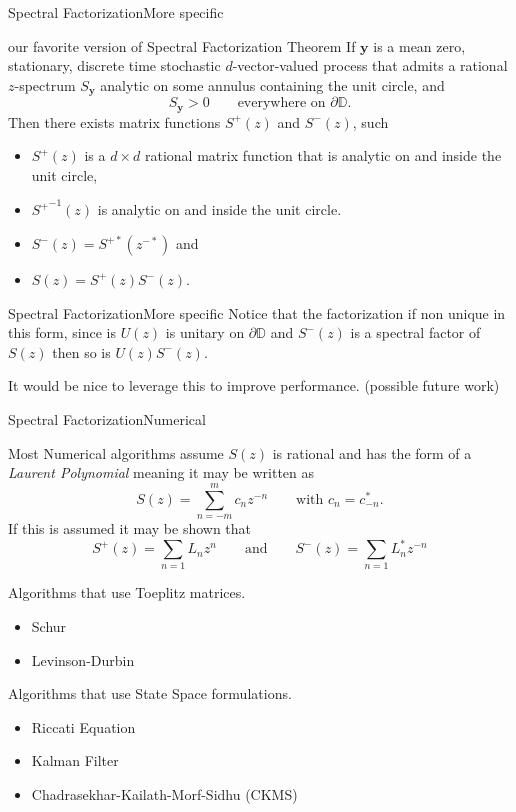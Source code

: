 \documentclass{beamer}  %
\renewcommand{\and}{\qquad \text{and}\qquad}
\newcommand{\D}{\mathbb{D}}
\begin{document}
\begin{frame}{Spectral Factorization}{More specific}
	
	\begin{block}{our favorite version of Spectral Factorization Theorem}
		If $\textbf{y}$ is a mean zero, stationary, discrete time stochastic $d$-vector-valued process that admits a rational $z$-spectrum $S_{\textbf{y}}$ analytic on some annulus containing the unit circle,  and $$S_{\textbf{y}} > 0 \qquad \text{everywhere on } \partial\D.$$ Then there exists matrix functions $S^+(z)$ and $S^-(z)$, such 
		\begin{itemize}
			\item $S^+(z)$ is a $d\times d$ rational matrix function that is analytic on and inside the unit circle,
			\item ${S^+}^{-1}(z)$ is analytic on and inside the unit circle.
			\item $S^-(z) = S^{+*}(z^{-*})$ and 
			\item $S(z) =S^+(z)S^-(z)$.	
		\end{itemize}
	\end{block}
	
\end{frame}
\begin{frame}{Spectral Factorization}{More specific}
Notice that the factorization if non unique in this form, since is $U(z)$ is unitary on $\partial \D$ and $S^-(z)$ is a spectral factor of $S(z)$ then so is $U(z)S^-(z)$.

\bigskip

It would be nice to leverage this to improve performance. (possible future work)

\end{frame}
\begin{frame}{Spectral Factorization}{Numerical}
	
	Most Numerical algorithms assume $S(z)$ is rational and has the form of a \emph{Laurent Polynomial} meaning it may be written as $$S(z) = \sum_{n=-m}^m c_nz^{-n}\qquad \text{with }c_n = c_{-n}^*.$$
	If this is assumed it may be shown that 
	$$S^+(z) = \sum_{n=1} L_n z^{n} \and S^-(z) = \sum_{n=1} L_n^* z^{-n}$$

	Algorithms that use Toeplitz matrices.
	\begin{itemize}
		\item Schur
		\item Levinson-Durbin
	\end{itemize}
	Algorithms that use State Space formulations.
	\begin{itemize}
		\item Riccati Equation
		\item Kalman Filter
		\item Chadrasekhar-Kailath-Morf-Sidhu (CKMS)
	\end{itemize}
\end{frame}
\end{document}
